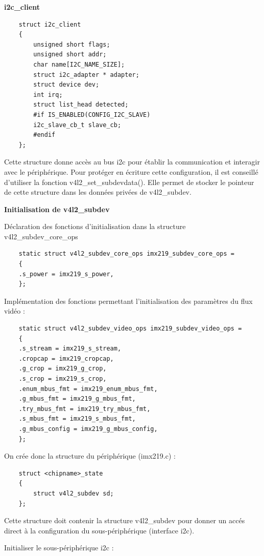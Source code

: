 \textbf{i2c\_client}

\begin{lstlisting}
    struct i2c_client
    {
        unsigned short flags;
        unsigned short addr;
        char name[I2C_NAME_SIZE];
        struct i2c_adapter * adapter;
        struct device dev;
        int irq;
        struct list_head detected;
        #if IS_ENABLED(CONFIG_I2C_SLAVE)
        i2c_slave_cb_t slave_cb;
        #endif
    };
\end{lstlisting}

Cette structure donne accès au bus i2c pour établir la communication et interagir avec le
périphérique. Pour protéger en écriture cette configuration, il est conseillé d’utiliser la
fonction v4l2\_set\_subdevdata(). Elle permet de stocker le pointeur de cette structure dans
les données privées de v4l2\_subdev.

\textbf{Initialisation de v4l2\_subdev}

Déclaration des fonctions d’initialisation dans la structure v4l2\_subdev\_core\_ops

\begin{lstlisting}
    static struct v4l2_subdev_core_ops imx219_subdev_core_ops =
    {
    .s_power = imx219_s_power,
    };
\end{lstlisting}

Implémentation des fonctions permettant l’initialisation des paramètres du flux vidéo :

\begin{lstlisting}
    static struct v4l2_subdev_video_ops imx219_subdev_video_ops = 
    {
    .s_stream = imx219_s_stream,
    .cropcap = imx219_cropcap,
    .g_crop = imx219_g_crop,
    .s_crop = imx219_s_crop,
    .enum_mbus_fmt = imx219_enum_mbus_fmt,
    .g_mbus_fmt = imx219_g_mbus_fmt,
    .try_mbus_fmt = imx219_try_mbus_fmt,
    .s_mbus_fmt = imx219_s_mbus_fmt,
    .g_mbus_config = imx219_g_mbus_config,
    };
\end{lstlisting}

On crée donc la structure du périphérique (imx219.c) :

\begin{lstlisting}
    struct <chipname>_state 
    {
        struct v4l2_subdev sd;
    };
\end{lstlisting}

Cette structure doit contenir la structure v4l2\_subdev pour donner un accés direct à la
configuration du sous-périphérique (interface i2c).

Initialiser le sous-périphérique i2c :

